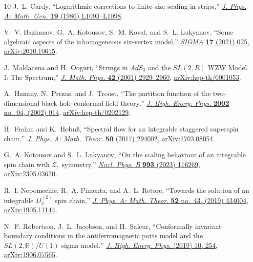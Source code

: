 \documentclass[12pt]{article}
\numberwithin{equation}{section}
\begin{document}
\begin{thebibliography}{10}
		J.~L. Cardy, ``{L}ogarithmic corrections to finite-size scaling in strips,''
		\href{http://dx.doi.org/10.1088/0305-4470/19/17/008}{{\em J. Phys. A: Math.
				Gen.} {\bfseries 19} (1986) L1093--L1098}.
		
		V.~V. Bazhanov, G.~A. Kotousov, S.~M. Koval, and S.~L. Lukyanov, ``Some
		algebraic aspects of the inhomogeneous six-vertex model,''
		\href{http://dx.doi.org/10.3842/SIGMA.2021.025}{{\em SIGMA} {\bfseries 17}
			(2021) 025}, \href{http://arxiv.org/abs/2010.10615}{{\ttfamily
				arXiv:2010.10615}}.
		
		J.~Maldacena and H.~Ooguri, ``{S}trings in ${A}d{S}_3$ and the ${SL}(2,{R})$
		{WZW} {M}odel. {I}: {T}he {S}pectrum,''
		\href{http://dx.doi.org/10.1063/1.1377273}{{\em J. Math. Phys.} {\bfseries
				42} (2001) 2929--2960}, \href{http://arxiv.org/abs/hep-th/0001053}{{\ttfamily
				arXiv:hep-th/0001053}}.
		
		A.~Hanany, N.~Prezas, and J.~Troost, ``The partition function of the
		two-dimensional black hole conformal field theory,''
		\href{http://dx.doi.org/10.1088/1126-6708/2002/04/014}{{\em J. High. Energ.
				Phys.} {\bfseries 2002} no.~04, (2002) 014},
		\href{http://arxiv.org/abs/hep-th/0202129}{{\ttfamily arXiv:hep-th/0202129}}.
		
		H.~Frahm and K.~Hobu{\ss}, ``Spectral flow for an integrable staggered
		superspin chain,'' \href{http://dx.doi.org/10.1088/1751-8121/aa77e7}{{\em J.
				Phys. A: Math. Theor.} {\bfseries 50} (2017) 294002},
		\href{http://arxiv.org/abs/1703.08054}{{\ttfamily arXiv:1703.08054}}.
		
		G.~A. Kotousov and S.~L. Lukyanov, ``On the scaling behaviour of an integrable
		spin chain with {$\mathcal{Z}_r$} symmetry,''
		\href{http://dx.doi.org/10.1016/j.nuclphysb.2023.116269}{{\em Nucl. Phys. B}
			{\bfseries 993} (2023) 116269},
		\href{http://arxiv.org/abs/2305.03620}{{\ttfamily arXiv:2305.03620}}.
		
		R.~I. Nepomechie, R.~A. Pimenta, and A.~L. Retore, ``{Towards the solution of
			an integrable {$D_2^{(2)}$} spin chain},''
		\href{http://dx.doi.org/10.1088/1751-8121/ab434d}{{\em J. Phys. A: Math.
				Theor.} {\bfseries 52} no.~43, (2019) 434004},
		\href{http://arxiv.org/abs/1905.11144}{{\ttfamily arXiv:1905.11144}}.
		
		N.~F. Robertson, J.~L. Jacobsen, and H.~Saleur, ``Conformally invariant
		boundary conditions in the antiferromagnetic potts model and the
		{$SL(2,\mathbb{R})/U(1)$} sigma model,''
		\href{http://dx.doi.org/10.1007/JHEP10(2019)254}{{\em J. High. Energ. Phys.}
			(2019) 10, 254}, \href{http://arxiv.org/abs/1906.07565}{{\ttfamily
				arXiv:1906.07565}}.
		

\end{thebibliography}
\end{document}
